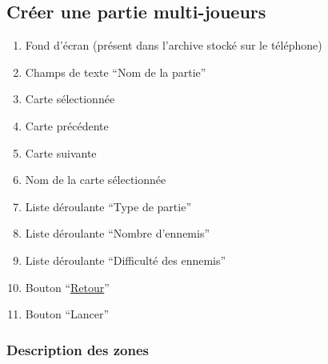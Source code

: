 \documentclass{report}
\begin{document}
\newpage

	\subsection{Créer une partie multi-joueurs}
	
		\hypertarget{Creer partie multi-joueurs}{}
		\label{Creer partie multi-joueurs}
	
		\begin{center}
			
		\end{center}
		
		\begin{enumerate}
		  \item Fond d'écran (présent dans l'archive stocké sur le téléphone)
		  \item Champs de texte ``Nom de la partie''
		  \item Carte sélectionnée
		  \item Carte précédente
		  \item Carte suivante
		  \item Nom de la carte sélectionnée
		  \item Liste déroulante ``Type de partie''
		  \item Liste déroulante ``Nombre d'ennemis''
		  \item Liste déroulante ``Difficulté des ennemis''
		  \item Bouton ``\hyperlink{Accueil multi-joueurs}{Retour}''
		  \item Bouton ``Lancer'' 
		\end{enumerate}

		\subsubsection{Description des zones}
		
\end{document}
